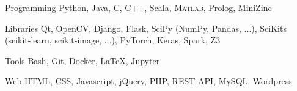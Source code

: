

\begin{minipage}[]{0.4\textwidth}
  \vspace{2.0mm}

  \begin{cvskills}
    \cvskill
      {Programming}
      {Python, Java, C, C++, Scala, \textsc{Matlab}, Prolog, MiniZinc}

    \cvskill
      {Libraries}
      {Qt, OpenCV, Django, Flask, SciPy (NumPy, Pandas, ...), SciKits (scikit-learn, scikit-image, ...), PyTorch, Keras, Spark, Z3}

    \cvskill
      {Tools}
      {Bash, Git, Docker, \LaTeX, Jupyter}

    \cvskill
      {Web}
      {HTML, CSS, Javascript, jQuery, PHP, REST API, MySQL, Wordpress}
  \end{cvskills}
\end{minipage}%
\begin{minipage}[]{0.6\textwidth}
  \hfill
\end{minipage}
\vspace{-2.0mm}


